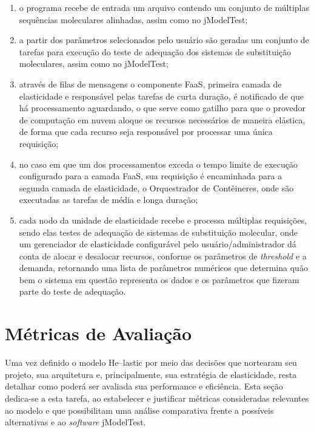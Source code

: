 \documentclass[english,brazilian]{UNISINOSmonografia} %
\begin{document}
\begin{enumerate}[label={\arabic*)}]

	\item o programa recebe de entrada um arquivo contendo um conjunto de múltiplas sequências moleculares alinhadas, assim como no jModelTest;
	
	\item a partir dos parâmetros selecionados pelo usuário são geradas um conjunto de tarefas para execução do teste de adequação dos sistemas de substituição moleculares, assim como no jModelTest;
	
	\item através de filas de mensagens o componente FaaS, primeira camada de elasticidade e responsável pelas tarefas de curta duração, é notificado de que há processamento aguardando, o que serve como gatilho para que o provedor de computação em nuvem aloque os recursos necessários de maneira elástica, de forma que cada recurso seja responsável por processar uma única requisição;
	
	\item no caso em que um dos processamentos exceda o tempo limite de execução configurado para a camada FaaS, sua requisição é encaminhada para a segunda camada de elasticidade, o Orquestrador de Contêineres, onde são executadas as tarefas de média e longa duração;
	
	\item cada nodo da unidade de elasticidade recebe e processa múltiplas requisições, sendo elas testes de adequação de sistemas de substituição molecular, onde um gerenciador de elasticidade configurável pelo usuário/administrador dá conta de alocar e desalocar recursos, conforme os parâmetros de \textit{threshold} e a demanda, retornando uma lista de parâmetros numéricos que determina quão bem o sistema em questão representa os dados e os parâmetros que fizeram parte do teste de adequação.

\end{enumerate}


\section{Métricas de Avaliação}
\label{sec:modelo-metricas}


Uma vez definido o modelo \textsf{He}--lastic por meio das decisões que nortearam seu projeto, sua arquitetura e, principalmente, sua estratégia de elasticidade, resta detalhar como poderá ser avaliada sua performance e eficiência.
Esta seção dedica-se a esta tarefa, ao estabelecer e justificar métricas consideradas relevantes ao modelo e que possibilitam uma análise comparativa frente a possíveis alternativas e ao \textit{software} jModelTest.
\end{document}
